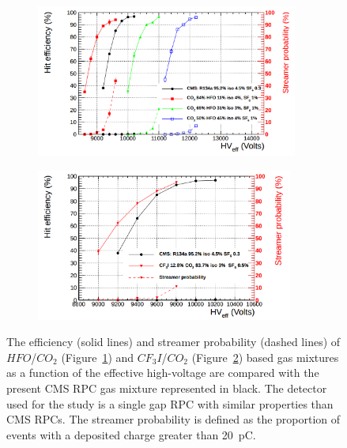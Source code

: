 	\begin{figure}[H]
		\hspace*{-0.1\linewidth}
		\begin{subfigure}{0.6\linewidth}
			\centering
			\includegraphics[height=5cm]{fig/chapt3/HFO-mixtures.png}
			\caption{\label{fig:RPC-eco:A}}
		\end{subfigure}
		\begin{subfigure}{0.6\linewidth}
			\centering
			\includegraphics[height=5cm]{fig/chapt3/CF3I-mixture.png}
			\caption{\label{fig:RPC-eco:B}}
		\end{subfigure}
		\caption{\label{fig:RPC-eco} The efficiency (solid lines) and streamer probability (dashed lines) of $HFO$/$CO_2$ (Figure~\ref{fig:RPC-eco:A}) and $CF_3I$/$CO_2$ (Figure~\ref{fig:RPC-eco:B}) based gas mixtures as a function of the effective high-voltage are compared with the present CMS RPC gas mixture represented in black. The detector used for the study is a single gap RPC with similar properties than CMS RPCs. The streamer probability is defined as the proportion of events with a deposited charge greater than \SI{20}{pC}.}
	\end{figure}
	
